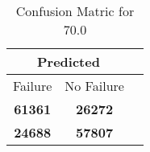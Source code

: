 \begin{table}[] 
\caption{Confusion Matric for 70.0} 
\label{Table: Prediction Accuracy-DMD70.0OnlySunEKF-ignoreReflection10.9EKF-top2-Reflection} 
\centering 
\begin{tabular} 
 {@{}ccc@{}} 
\toprule 
\multicolumn{2}{c}{\textbf{Predicted}}
 \\ \midrule 
\multicolumn{1}{|c|}{Failure} & 
\multicolumn{1}{c|}{No Failure}
 \\ \midrule 
\multicolumn{1}{|c|}{\color{green}\textbf{61361}} & 
\multicolumn{1}{c|}{\color{red}\textbf{26272}}
 \\ \midrule 
\multicolumn{1}{|c|}{\color{red}\textbf{24688}} & 
\multicolumn{1}{c|}{\color{green}\textbf{57807}}
 \\ \bottomrule 
\end{tabular} 
\end{table} 
